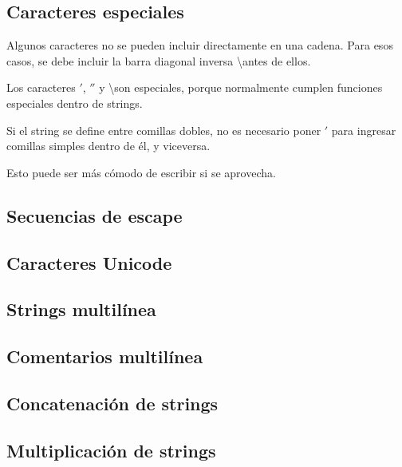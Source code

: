 \documentclass{article}
\begin{document}
\subsection{Caracteres especiales}

Algunos caracteres no se pueden incluir directamente en una cadena. Para esos casos, se debe incluir la barra diagonal inversa \textbackslash antes de ellos.

\begin{listing*}[ht!]
  \caption{Los caracteres $'$, $''$ y \textbackslash son especiales, porque normalmente cumplen funciones especiales dentro de strings.}
\end{listing*}

Si el string se define entre comillas dobles, no es necesario poner $'$ para ingresar comillas simples dentro de él, y viceversa.

\begin{listing*}[ht!]
  \caption{Esto puede ser más cómodo de escribir si se aprovecha.}
\end{listing*}

\subsection{Secuencias de escape}

\subsection{Caracteres Unicode}

\subsection{Strings multilínea}

\subsection{Comentarios multilínea}

\subsection{Concatenación de strings}

\subsection{Multiplicación de strings}
\end{document}
